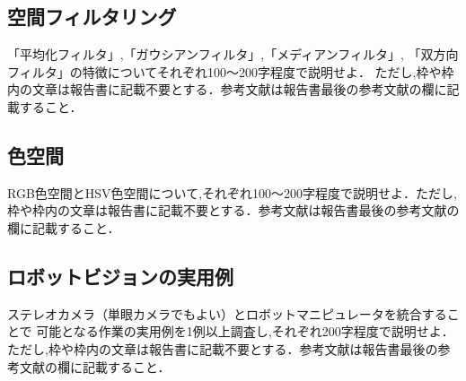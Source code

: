\subsection{空間フィルタリング}
「平均化フィルタ」,「ガウシアンフィルタ」,「メディアンフィルタ」,
「双方向フィルタ」の特徴についてそれぞれ100〜200字程度で説明せよ．
ただし,枠や枠内の文章は報告書に記載不要とする．参考文献は報告書最後の参考文献の欄に記載すること．

\subsection{色空間}
RGB色空間とHSV色空間について,それぞれ100〜200字程度で説明せよ．ただし,
枠や枠内の文章は報告書に記載不要とする．参考文献は報告書最後の参考文献の欄に記載すること．

\subsection{ロボットビジョンの実用例}
ステレオカメラ（単眼カメラでもよい）とロボットマニピュレータを統合することで
可能となる作業の実用例を1例以上調査し,それぞれ200字程度で説明せよ．
ただし,枠や枠内の文章は報告書に記載不要とする．参考文献は報告書最後の参考文献の欄に記載すること．

